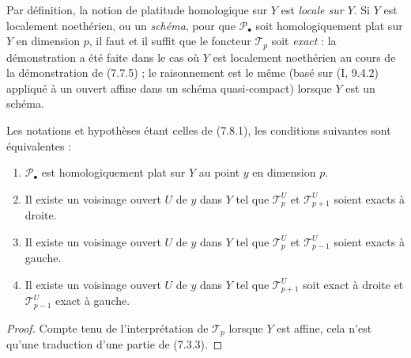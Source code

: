 \begin{env}[7.8.2]
Par définition, la notion de platitude homologique sur $Y$ est \emph{locale sur
$Y$}. Si $Y$ est localement noethérien, ou un \emph{schéma}, pour que
$\mathscr P_\bullet$ soit homologiquement plat sur $Y$ en dimension $p$, il faut
et il suffit que le foncteur $\mathscr T_p$ soit \emph{exact} : la démonstration
a été faite dans le cas où $Y$ est localement noethérien au cours de la
démonstration de (7.7.5) ; le raisonnement est le même (basé sur (I, 9.4.2)
appliqué à un ouvert affine dans un schéma quasi-compact) lorsque $Y$ est un
schéma.
\end{env}

\begin{proposition}[7.8.3]
Les notations et hypothèses étant celles de (7.8.1), les conditions suivantes
sont équivalentes :
\begin{enumerate}
  \item[a)] $\mathscr P_\bullet$ est homologiquement plat sur $Y$ au point $y$
    en dimension $p$.
  \item[b)] Il existe un voisinage ouvert $U$ de $y$ dans $Y$ tel que
    $\mathscr T_p^U$ et $\mathscr T_{p+1}^U$ soient exacts à droite.
  \item[c)] Il existe un voisinage ouvert $U$ de $y$ dans $Y$ tel que
    $\mathscr T_p^U$ et $\mathscr T_{p-1}^U$ soient exacts à gauche.
  \item[d)] Il existe un voisinage ouvert $U$ de $y$ dans $Y$ tel que
    $\mathscr T_{p+1}^U$ soit exact à droite et $\mathscr T_{p-1}^U$ exact à
    gauche.
\end{enumerate}
\end{proposition}

\begin{proof}
Compte tenu de l'interprétation de $\mathscr T_p$ lorsque $Y$ est affine, cela
n'est qu'une traduction d'une partie de (7.3.3).
\end{proof}

